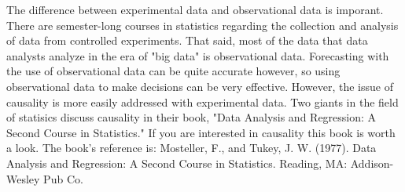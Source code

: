 \documentclass{book}
\begin{document}
The difference between experimental data and observational data is imporant. There are semester-long courses in statistics regarding the collection and analysis of data from controlled experiments. That said, most of the data that data analysts analyze in the era of "big data" is observational data. Forecasting with the use of observational data can be quite accurate however, so using observational data to make decisions can be very effective. However, the issue of causality is more easily addressed with experimental data. Two giants in the field of statisics discuss causality in their book, "Data Analysis and Regression: A Second Course in Statistics." If you are interested in causality this book is worth a look. The book's reference is: Mosteller, F., and Tukey, J. W. (1977). Data Analysis and Regression: A Second Course in Statistics. Reading, MA: Addison-Wesley Pub Co.

\printbibliography
\end{document}
